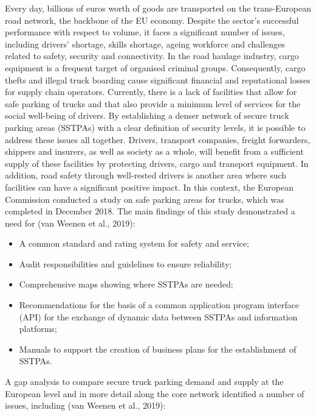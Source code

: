 \documentclass[
]{book}
\providecommand{\tightlist}{%
  \setlength{\itemsep}{0pt}\setlength{\parskip}{0pt}}
\begin{document}
Every day, billions of euros worth of goods are transported on the trans-European road network, the backbone of the EU economy. Despite the sector's successful performance with respect to volume, it faces a significant number of issues, including drivers' shortage, skills shortage, ageing workforce and challenges related to safety, security and connectivity. In the road haulage industry, cargo equipment is a frequent target of organised criminal groups. Consequently, cargo thefts and illegal truck boarding cause significant financial and reputational losses for supply chain operators.
Currently, there is a lack of facilities that allow for safe parking of trucks and that also provide a minimum level of services for the social well-being of drivers. By establishing a denser network of secure truck parking areas (SSTPAs) with a clear definition of security levels, it is possible to address these issues all together. Drivers, transport companies, freight forwarders, shippers and insurers, as well as society as a whole, will benefit from a sufficient supply of these facilities by protecting drivers, cargo and transport equipment. In addition, road safety through well-rested drivers is another area where such facilities can have a significant positive impact. In this context, the European Commission conducted a study on safe parking areas for trucks, which was completed in December 2018. The main findings of this study demonstrated a need for (van Weenen et al., 2019):

\begin{itemize}
\tightlist
\item
  A common standard and rating system for safety and service;
\item
  Audit responsibilities and guidelines to ensure reliability;
\item
  Comprehensive maps showing where SSTPAs are needed;
\item
  Recommendations for the basis of a common application program interface (API) for the exchange of dynamic data between SSTPAs and information platforms;
\item
  Manuals to support the creation of business plans for the establishment of SSTPAs.
\end{itemize}

A gap analysis to compare secure truck parking demand and supply at the European level and in more detail along the core network identified a number of issues, including (van Weenen et al., 2019):
\end{document}
